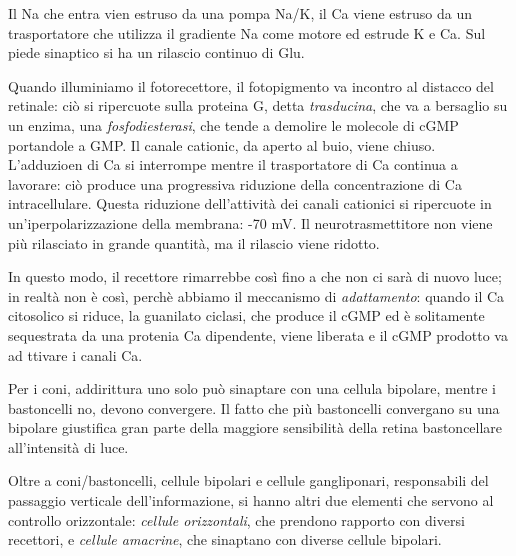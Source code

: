 \documentclass[a4paper,12pt]{article}
\begin{document}
Il Na che entra vien estruso da una pompa Na/K, il Ca viene estruso da un trasportatore che utilizza il gradiente Na come motore ed estrude K e Ca. Sul piede sinaptico si ha un rilascio continuo di Glu.  

Quando illuminiamo il fotorecettore, il fotopigmento va incontro al distacco del retinale: ciò si ripercuote sulla proteina G, detta \emph{trasducina}, che va a bersaglio su un enzima, una \emph{fosfodiesterasi}, che tende a demolire le molecole di cGMP portandole a GMP. Il canale cationic, da aperto al buio, viene chiuso. L'adduzioen di Ca si interrompe mentre il trasportatore di Ca continua a lavorare: ciò produce una progressiva riduzione della concentrazione di Ca intracellulare. Questa riduzione dell'attività dei canali cationici si ripercuote in un'iperpolarizzazione della membrana: -70 mV. Il neurotrasmettitore non viene più rilasciato in grande quantità, ma il rilascio viene ridotto.

In questo modo, il recettore rimarrebbe così fino a che non ci sarà di nuovo luce; in realtà non è così, perchè abbiamo il meccanismo di \emph{adattamento}: quando il Ca citosolico si riduce, la guanilato ciclasi, che produce il cGMP ed è solitamente sequestrata da una protenia Ca dipendente, viene liberata e il cGMP prodotto va ad ttivare i canali Ca. 

Per i coni, addirittura uno solo può sinaptare con una cellula bipolare, mentre i bastoncelli no, devono convergere. Il fatto che più bastoncelli convergano su una bipolare giustifica gran parte della maggiore sensibilità della retina bastoncellare all'intensità di luce.

Oltre a coni/bastoncelli, cellule bipolari e cellule gangliponari, responsabili del passaggio verticale dell'informazione, si hanno altri due elementi che servono al controllo orizzontale: \emph{cellule orizzontali}, che prendono rapporto con diversi recettori, e \emph{cellule amacrine}, che sinaptano con diverse cellule bipolari. 
\end{document}
